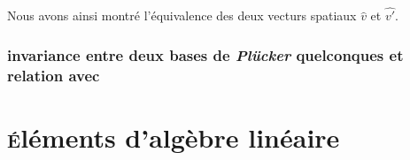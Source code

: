 Nous avons ainsi montré l'équivalence des deux vecturs spatiaux $\widehat{v}$ et $\widehat{v'}$.

\subsection{invariance entre deux bases de \emph{Plücker} quelconques et relation avec }


\chapter{\textsc{é}léments d'algèbre linéaire} \label{appx_algLineaire}




